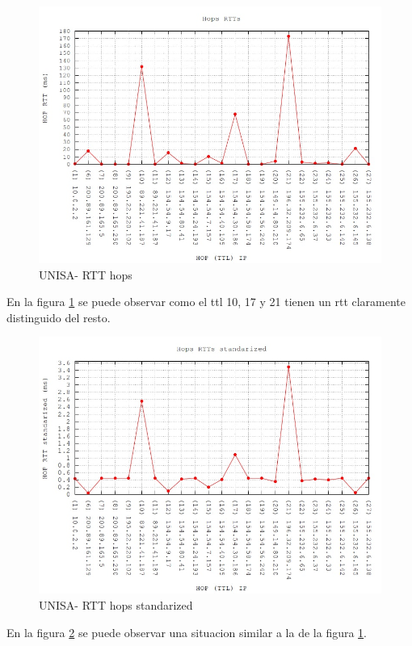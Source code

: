 \begin{figure}[!htbp]
  \centering
    \includegraphics[scale=0.6]{imagenes/unisa-graficos/traceroute-unisa.jpg}
  \caption{UNISA- RTT hops}
  \label{fig:1}
\end{figure}

En la figura \ref{fig:1} se puede observar como el ttl 10, 17 y 21 tienen un rtt claramente distinguido del resto.

\begin{figure}[!htbp]
  \centering
    \includegraphics[scale=0.6]{imagenes/unisa-graficos/traceroute-unisa-standarized.jpg}
  \caption{UNISA- RTT hops standarized}
  \label{fig:2}
\end{figure}

En la figura \ref{fig:2} se puede observar una situacion similar a la de la figura \ref{fig:1}.

